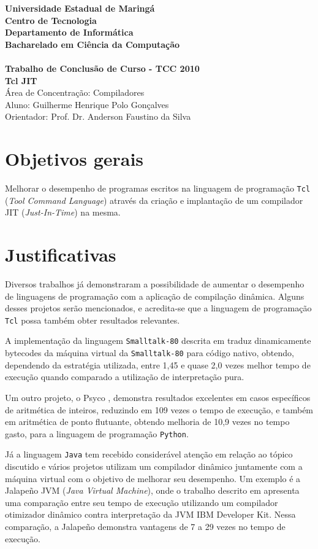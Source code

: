 \documentclass[12pt]{article}
\newcommand{\instituicao}{Universidade Estadual de Maringá \\
Centro de Tecnologia \\
Departamento de Informática \\
Bacharelado em Ciência da Computação \\
\hfill}
\newcommand{\titulo}{
Trabalho de Conclusão de Curso - TCC 2010\\ [5cm]
Tcl JIT}
\newcommand{\areaconcentracao}{Compiladores}
\newcommand{\autor}{Guilherme Henrique Polo Gonçalves}
\newcommand{\orientador}{Prof. Dr. Anderson Faustino da Silva}
\newcommand*{\textbfsf}[1]{\textbf{\textsf{#1}}}
\begin{document}
\begin{titlepage}
  \vfill
  \begin{center}
  {\Large \textbfsf \instituicao} \\
  {\large \textbfsf \titulo}\\[5cm]
  Área de Concentração: \areaconcentracao \\
  Aluno: \autor\\ %
  Orientador: \orientador\\ %
  \vfill
  \end{center}
\end{titlepage}


\section{Objetivos gerais}
Melhorar o desempenho de programas escritos na linguagem de
programação \texttt{Tcl}
(\emph{Tool Command Language}) através da criação e implantação de um
compilador JIT (\textit{Just-In-Time}) na mesma.


\section{Justificativas}
Diversos trabalhos já demonstraram a possibilidade de aumentar o
desempenho de linguagens de programação com a aplicação de compilação
dinâmica. Alguns desses projetos serão mencionados, e acredita-se que a
linguagem de programação \texttt{Tcl} possa também obter 
resultados relevantes.

A implementação da linguagem \texttt{Smalltalk-80} descrita em
\cite{deutsch84efficient} traduz dinamicamente bytecodes da máquina
virtual da \texttt{Smalltalk-80} para código nativo, obtendo,
dependendo da estratégia utilizada, entre 1,45 e quase 2,0 vezes
melhor tempo de execução quando comparado a utilização de
interpretação pura.

Um outro projeto, o Psyco \cite{psyco}, demonstra resultados
excelentes em casos específicos de aritmética de inteiros, reduzindo
em 109 vezes o tempo de execução, e também em aritmética de
ponto flutuante, obtendo melhoria de 10,9 vezes 
no tempo gasto, para a linguagem de programação \texttt{Python}.

Já a linguagem \texttt{Java} tem recebido considerável atenção
em relação ao tópico discutido e vários projetos utilizam
um compilador dinâmico juntamente com a máquina virtual 
com o objetivo de melhorar seu desempenho. Um exemplo é a Jalapeño JVM
(\textit{Java Virtual Machine}), onde o trabalho descrito em
\cite{jalapeno_1} apresenta uma comparação entre seu tempo de execução
utilizando um compilador otimizador dinâmico contra
interpretação da JVM IBM Developer Kit. Nessa comparação, a Jalapeño
demonstra vantagens de 7 a 29 vezes no tempo de execução.
\end{document}

